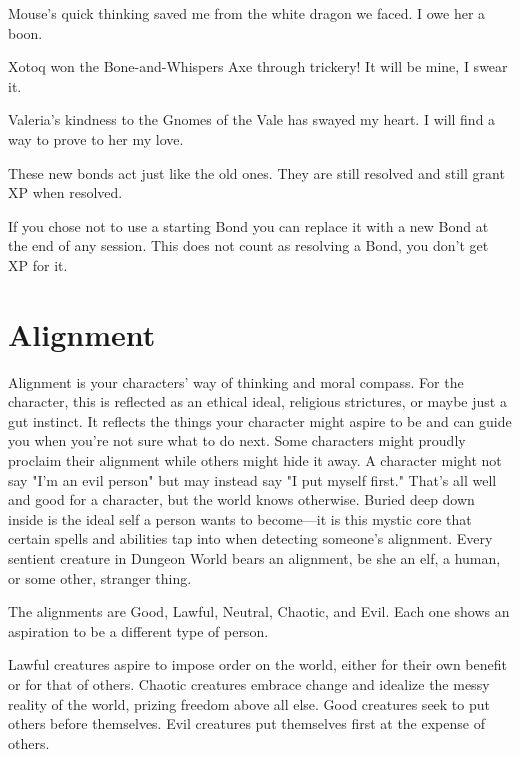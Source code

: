  
\item Mouse's quick thinking saved me from the white dragon we faced. I owe her a boon.

 
\item Xotoq won the Bone-and-Whispers Axe through trickery! It will be mine, I swear it.

 
\item Valeria's kindness to the Gnomes of the Vale has swayed my heart. I will find a way to prove to her my love.


\stopitemize
 

These new bonds act just like the old ones. They are still resolved and still grant XP when resolved.

 

If you chose not to use a starting Bond you can replace it with a new Bond at the end of any session. This does not count as resolving a Bond, you don't get XP for it.

 
\section{Alignment}   
 

Alignment is your characters' way of thinking and moral compass. For the character, this is reflected as an ethical ideal, religious strictures, or maybe just a gut instinct. It reflects the things your character might aspire to be and can guide you when you're not sure what to do next. Some characters might proudly proclaim their alignment while others might hide it away. A character might not say "I'm an evil person" but may instead say "I put myself first." That's all well and good for a character, but the world knows otherwise. Buried deep down inside is the ideal self a person wants to become—it is this mystic core that certain spells and abilities tap into when detecting someone's alignment. Every sentient creature in Dungeon World bears an alignment, be she an elf, a human, or some other, stranger thing.

 

The alignments are Good, Lawful, Neutral, Chaotic, and Evil. Each one shows an aspiration to be a different type of person.

 

Lawful creatures aspire to impose order on the world, either for their own benefit or for that of others. Chaotic creatures embrace change and idealize the messy reality of the world, prizing freedom above all else. Good creatures seek to put others before themselves. Evil creatures put themselves first at the expense of others.

